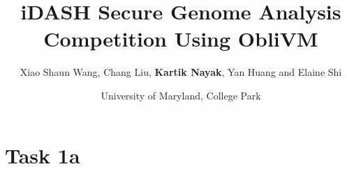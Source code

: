 \documentclass[t,ignorenonframetext]{beamer}
\title[]{iDASH Secure Genome Analysis Competition Using ObliVM}
\author[]{Xiao Shaun Wang, Chang Liu, \textbf{Kartik Nayak}, Yan Huang and Elaine Shi}
\date{University of Maryland, College Park}
\newcommand\myblock[4]{%
\begin{textblock}{#1}(#2, #3)%
  \begin{center}
    #4
  \end{center}
\end{textblock}
}
\newcommand\leftblock[4]{%
\begin{textblock}{#1}(#2, #3)%
  \vspace*{\fill}
    #4
  \vspace*{\fill}
\end{textblock}
}
\begin{document}
\frame{
\maketitle
}
\section{Task 1a}

\begin{comment}
\begin{frame}
\begin{itemize}
\item Compute minor allele frequencies
\myblock{8}{0}{1}{Alice\\
$l^A = (e^A_1,...,e^A_n)$
}
\myblock{8}{8}{1}{Bob\\
$l^B = (e^B_1,...,e^B_n)$
}
\pause
\myblock{16}{0}{4}{where $e_i^X \in \{A, T, C, G\}$}
\pause
\myblock{8}{0}{6}{
AA AC AA\\
$f_1^A = 5, f_2^A = 1$
}
\myblock{8}{8}{6}{
AA AC CC\\
$f_1^B = 3, f_2^B = 3$
}
\pause
\myblock{16}{0}{9}{
Secure Computation\\
$(f_1, f_2) = (f^A_1+f^A_1, f^B_2+f^B_2)$\\
\pause
40 AND gates
}
\end{itemize}
\end{frame}

\section{Task 1B}
\label{sec:task1b}

\begin{frame}{Problem Statement}
  \begin{itemize}
    \item Task 1b: Computing $\chi^2$ statistic
    \myblock{10}{0}{1}{Alice\\
      $l^A_{case} = (e^A_1,...,e^A_n)$\\
      $l^A_{control} = (e'^A_1,...,e'^A_n)$
    }
    \myblock{10}{10}{1}{Bob\\
      $l^B_{case} = (e^B_1,...,e^B_n)$\\
      $l^B_{control} = (e'^B_1,...,e'^B_n)$
    }
    \pause
    \leftblock{20}{0}{5}{
      $a, b$: frequencies of two alleles in $l_{case} = l^A_{case} || l^B_{case}$\\
      $c, d$: frequencies of two alleles in $l_{control} = l^A_{control} || l^B_{control}$
    }
    \pause
    \myblock{20}{0}{8}{
      $\chi^2 = n\times\frac{(ad-bc)^2}{rsgk}$\\
      where $r = a + b, s = c + d, g = a + c,$\\$k = b + d, n =  r + s$
    }
  \end{itemize}
\end{frame}


\end{comment}
\end{document}
